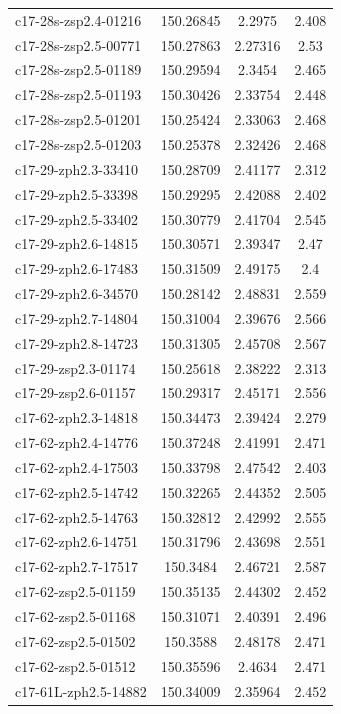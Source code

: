 \documentclass[twocolumn,tight,times]{aastex63}
\begin{document}
\begin{center}
\begin{longtable}{l|c|c|c}
c17-28s-zsp2.4-01216 & 150.26845 & 2.2975 & 2.408 \\
c17-28s-zsp2.5-00771 & 150.27863 & 2.27316 & 2.53 \\
c17-28s-zsp2.5-01189 & 150.29594 & 2.3454 & 2.465 \\
c17-28s-zsp2.5-01193 & 150.30426 & 2.33754 & 2.448 \\
c17-28s-zsp2.5-01201 & 150.25424 & 2.33063 & 2.468 \\
c17-28s-zsp2.5-01203 & 150.25378 & 2.32426 & 2.468 \\
c17-29-zph2.3-33410 & 150.28709 & 2.41177 & 2.312 \\
c17-29-zph2.5-33398 & 150.29295 & 2.42088 & 2.402 \\
c17-29-zph2.5-33402 & 150.30779 & 2.41704 & 2.545 \\
c17-29-zph2.6-14815 & 150.30571 & 2.39347 & 2.47 \\
c17-29-zph2.6-17483 & 150.31509 & 2.49175 & 2.4 \\
c17-29-zph2.6-34570 & 150.28142 & 2.48831 & 2.559 \\
c17-29-zph2.7-14804 & 150.31004 & 2.39676 & 2.566 \\
c17-29-zph2.8-14723 & 150.31305 & 2.45708 & 2.567 \\
c17-29-zsp2.3-01174 & 150.25618 & 2.38222 & 2.313 \\
c17-29-zsp2.6-01157 & 150.29317 & 2.45171 & 2.556 \\
c17-62-zph2.3-14818 & 150.34473 & 2.39424 & 2.279 \\
c17-62-zph2.4-14776 & 150.37248 & 2.41991 & 2.471 \\
c17-62-zph2.4-17503 & 150.33798 & 2.47542 & 2.403 \\
c17-62-zph2.5-14742 & 150.32265 & 2.44352 & 2.505 \\
c17-62-zph2.5-14763 & 150.32812 & 2.42992 & 2.555 \\
c17-62-zph2.6-14751 & 150.31796 & 2.43698 & 2.551 \\
c17-62-zph2.7-17517 & 150.3484 & 2.46721 & 2.587 \\
c17-62-zsp2.5-01159 & 150.35135 & 2.44302 & 2.452 \\
c17-62-zsp2.5-01168 & 150.31071 & 2.40391 & 2.496 \\
c17-62-zsp2.5-01502 & 150.3588 & 2.48178 & 2.471 \\
c17-62-zsp2.5-01512 & 150.35596 & 2.4634 & 2.471 \\
c17-61L-zph2.5-14882 & 150.34009 & 2.35964 & 2.452 \\

\end{longtable}
\end{center}
\end{document}
